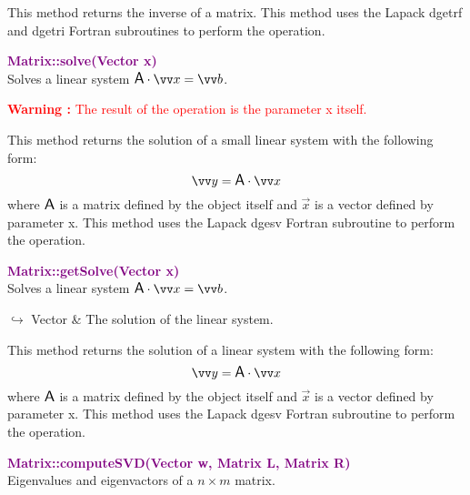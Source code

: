 This method returns the inverse of a matrix.
This method uses the Lapack \textsf{dgetrf} and \textsf{dgetri} Fortran subroutines to perform the operation.

\textcolor{purple}{\textbf{Matrix::solve(Vector x)}}\label{Matrix::solve(Vector x)}\\
Solves a linear system $\A\cdot \overrightarrow{x} = \overrightarrow{b}$.

\hspace*{10mm}\textcolor{red}{\textbf{Warning :}  The result of the operation is the parameter x itself.}

This method returns the solution of a small linear system with the following form:
\begin{equation*}
\overrightarrow{y} = \A \cdot \overrightarrow{x}
\end{equation*}
where $\mbox{\large\ensuremath{\mathsf{A}}}$ is a matrix defined by the object itself and $\overrightarrow{x}$ is a vector defined by parameter x.
This method uses the Lapack \textsf{dgesv} Fortran subroutine to perform the operation.

\textcolor{purple}{\textbf{Matrix::getSolve(Vector x)}}\label{Matrix::getSolve(Vector x)}\\
Solves a linear system $\A\cdot \overrightarrow{x} = \overrightarrow{b}$.\vspace*{-0.5em}
\begin{tcolorbox}[grow to left by=-1cm, width=\textwidth-1cm,myArgs,tabularx={l|R}]
$\hookrightarrow$ Vector & The solution of the linear system.
\end{tcolorbox}

This method returns the solution of a linear system with the following form:
\begin{equation*}
\overrightarrow{y} = \A \cdot \overrightarrow{x}
\end{equation*}
where $\mbox{\large\ensuremath{\mathsf{A}}}$ is a matrix defined by the object itself and $\overrightarrow{x}$ is a vector defined by parameter x.
This method uses the Lapack \textsf{dgesv} Fortran subroutine to perform the operation.

\textcolor{purple}{\textbf{Matrix::computeSVD(Vector w, Matrix L, Matrix R)}}\label{Matrix::computeSVD(Vector w, Matrix L, Matrix R)}\\
Eigenvalues and eigenvactors of a $n \times m$ matrix.

